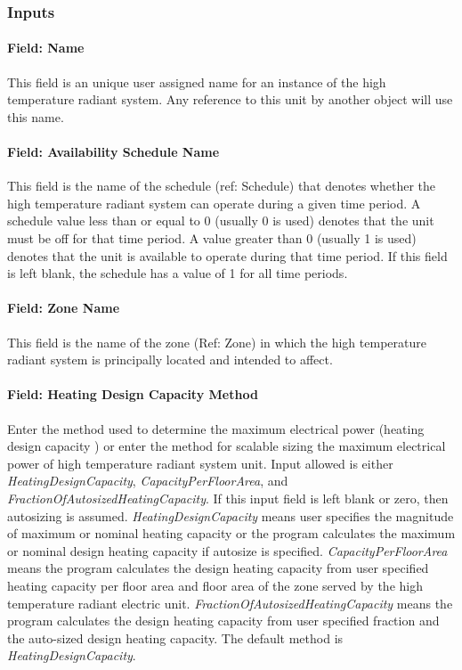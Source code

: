 \subsubsection{Inputs}\label{inputs-9-015}

\paragraph{Field: Name}\label{field-name-9-013}

This field is an unique user assigned name for an instance of the high temperature radiant system. Any reference to this unit by another object will use this name.

\paragraph{Field: Availability Schedule Name}\label{field-availability-schedule-name-8-003}

This field is the name of the schedule (ref: Schedule) that denotes whether the high temperature radiant system can operate during a given time period. A schedule value less than or equal to 0 (usually 0 is used) denotes that the unit must be off for that time period. A value greater than 0 (usually 1 is used) denotes that the unit is available to operate during that time period. If this field is left blank, the schedule has a value of 1 for all time periods.

\paragraph{Field: Zone Name}\label{field-zone-name-3-004}

This field is the name of the zone (Ref: Zone) in which the high temperature radiant system is principally located and intended to affect.

\paragraph{Field: Heating Design Capacity Method}\label{field-heating-design-capacity-method-7}

Enter the method used to determine the maximum electrical power (heating design capacity ) or enter the method for scalable sizing the maximum electrical power of high temperature radiant system unit. Input allowed is either \emph{HeatingDesignCapacity}, \emph{CapacityPerFloorArea}, and \emph{FractionOfAutosizedHeatingCapacity}. If this input field is left blank or zero, then autosizing is assumed. \emph{HeatingDesignCapacity} means user specifies the magnitude of maximum or nominal heating capacity or the program calculates the maximum or nominal design heating capacity if autosize is specified. \emph{CapacityPerFloorArea} means the program calculates the design heating capacity from user specified heating capacity per floor area and floor area of the zone served by the high temperature radiant electric unit. \emph{FractionOfAutosizedHeatingCapacity} means the program calculates the design heating capacity from user specified fraction and the auto-sized design heating capacity. The default method is \emph{HeatingDesignCapacity}.

